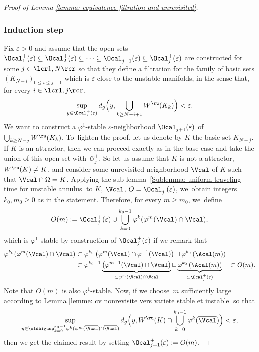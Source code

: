 \begin{proof}[Proof of Lemma \ref{lemma: equivalence filtration and unrevisited}]
\subsubsection*{Induction step}
Fix $\varepsilon > 0$ and assume that the open sets $\Ocal_1^+ (\varepsilon) \subseteq \Ocal_2^+ (\varepsilon) \subseteq \cdots \subseteq \Ocal_{j-1}^+ (\varepsilon) \subseteq \Ocal_j^+ (\varepsilon)$ are constructed for some $j\in\lcr1,N\rcr$ so that they define a filtration for the family of basic sets $(K_{N-i})_{0 \leq i \leq j-1}$ which is $\varepsilon$-close to the unstable manifolds, in the sense that, for every $i\in\lcr1,j\rcr$,
\[
\sup_{y \in \Ocal_i^+ (\varepsilon)} d_g \Bigl(y, \bigcup_{k \geq N- i +1} W^\ru (K_{k}) \Bigr) < \varepsilon.
\]
We want to construct a $\varphi^1$-stable $\varepsilon$-neighborhood $\Ocal_{j+1}^+ (\varepsilon)$ of $\bigcup_{k \geq N-j} W^\ru (K_{k})$. To~lighten the proof, let us denote by $K$ the basic set $K_{N-j}$. If $K$ is an attractor, then we can proceed exactly as in the base case and take the union of this open set with~$\mathcal{O}_{j}^+$. So let us assume that $K$ is not a attractor, \ie $W^\ru (K) \neq K$, and consider some unrevisited neighborhood $\Vcal$ of $K$ such that $\overline{\Vcal} \cap \Omega = K$. Applying the sub-lemma~\ref{Sublemma: uniform traveling time for unstable annulus} to $K$, $\Vcal$, $O = \Ocal_j^+ (\varepsilon)$, we~obtain integers $k_0, m_0 \geq 0$ as in the statement. Therefore, for every $m \geq m_0$, we~define
\[
O (m):= \Ocal_j^+ (\varepsilon) \cup \bigcup_{k = 0}^{k_0 - 1} \varphi^{k} (\varphi^{m} (\Vcal) \cap \Vcal),
\]
which is $\varphi^1$-stable by construction of $\Ocal_j^+ (\varepsilon)$ if we remark that
\begin{align*}
\varphi^{k_0} (\varphi^{m} (\Vcal) \cap \Vcal) &\subset \varphi^{ k_0} \left(\varphi^{m} (\Vcal) \cap \varphi^{-1} (\Vcal)\right) \sqcup \varphi^{k_0}\left(\Acal (m)\right) \\
&\subset \varphi^{ k_0 - 1} \underbrace{\left(\varphi^{m+1} (\Vcal) \cap \Vcal \right)}_{\subset \varphi^{m} (\Vcal) \cap \Vcal} \sqcup \underbrace{\varphi^{k_0}\left(\Acal (m)\right)}_{\subset \Ocal_j^+ (\varepsilon)} \quad \subset O (m).
\end{align*}
Note that $\overline{O (m)}$ is also $\varphi^1$-stable. Now, if we choose~$m$ sufficiently large according to Lemma \ref{lemme: cv nonrevisite vers variete stable et instable} so that
\[
\sup_{y \in \oldbigcup_{k = 0}^{k_0 - 1} \varphi^{k} (\varphi^{m} (\overline{\Vcal}) \cap \overline{\Vcal})}d_g \Bigl(y, W^\ru (K) \cap \bigcup_{k = 0}^{k_0 - 1} \varphi^k (\overline{\Vcal}) \Bigr) < \varepsilon,
\]
then we get the claimed result by setting $\Ocal_{j+1}^+ (\varepsilon):= O (m)$.
\end{proof}

